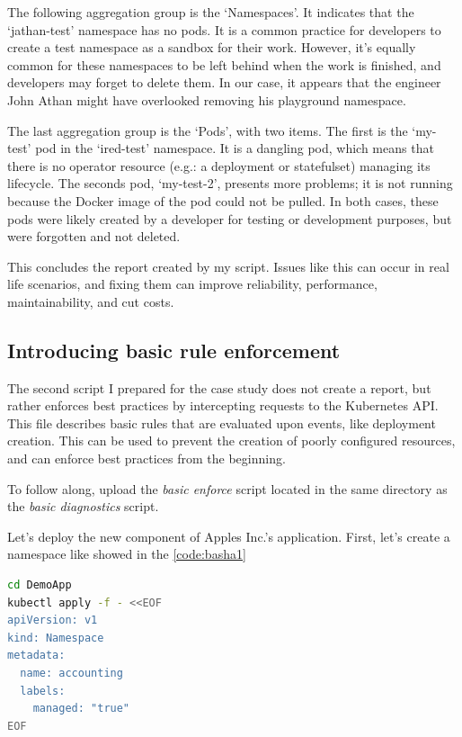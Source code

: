 The following aggregation group is the `Namespaces'. It indicates that the `jathan-test' namespace has no pods. It is a common practice for developers to create a test namespace as a sandbox for their work. However, it's equally common for these namespaces to be left behind when the work is finished, and developers may forget to delete them. In our case, it appears that the engineer John Athan might have overlooked removing his playground namespace.

The last aggregation group is the `Pods', with two items. The first is the `my-test' pod in the `ired-test' namespace. It is a dangling pod, which means that there is no operator resource (e.g.: a deployment or statefulset) managing its lifecycle. The seconds pod, `my-test-2', presents more problems; it is not running because the Docker image of the pod could not be pulled.  In both cases, these pods were likely created by a developer for testing or development purposes, but were forgotten and not deleted.

This concludes the report created by my script. Issues like this can occur in real life scenarios, and fixing them can improve reliability, performance, maintainability, and cut costs.

\subsection{Introducing basic rule enforcement}

The second script I prepared for the case study does not create a report, but rather enforces best practices by intercepting requests to the Kubernetes API.
This file describes basic rules that are evaluated upon events, like deployment creation. This can be used to prevent the creation of poorly configured resources, and can enforce best practices from the beginning.

To follow along, upload the \emph{basic enforce} script located in the same directory as the \emph{basic diagnostics} script.

Let's deploy the new component of Apples Inc.'s application. First, let's create a namespace like showed in the \ref{code:basha1}

\begin{lstlisting}[caption={Create namespace for the Accounting module},language=bash,label=code:basha1]
cd DemoApp
kubectl apply -f - <<EOF
apiVersion: v1
kind: Namespace
metadata:
  name: accounting
  labels:
    managed: "true"
EOF
\end{lstlisting}

